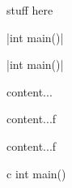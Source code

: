 \documentclass{article}
\begin{document}
stuff here

\cinline|int main()|

\renewcommand{\ctmlstinlineoptions}{frame=none, fontsize=\fontsize{15}{15}}
\cinline|int main()|


\begin{tcbconsole*}
content...
\end{tcbconsole*}

\begin{tcbconsole}
content...f
\end{tcbconsole}

\begin{tcbverbatim}
content...f
\end{tcbverbatim}

\begin{tcbcode}{c}
int main()
\end{tcbcode}

\end{document}
